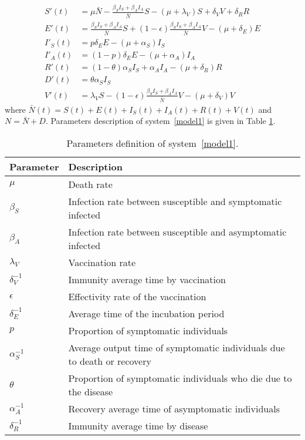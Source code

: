 \begin{equation}\label{model1}
  \begin{aligned}
	S'(t)&=\mu \bar{N}-\frac{\beta_S I_S+\beta_AI_A}{\bar{N}}S-(\mu+\lambda_V)S +\delta_V V+ \delta_R R\\
	E'(t)&= \frac{\beta_S I_S+\beta_AI_A}{\bar{N}}S+(1-\epsilon) \frac{\beta_S I_S+\beta_AI_A}{\bar{N}}V-(\mu+\delta_E) E \\
	I'_S(t)&= p \delta_E E-(\mu+\alpha_S) I_S\\
	I'_A(t)&= (1-p) \delta_E E-(\mu+\alpha_A) I_A \\
	R'(t)&= (1-\theta) \alpha_S I_S+\alpha_A I_A-(\mu+\delta_R) R \\
	D'(t)&= \theta \alpha_S I_S \\
	V'(t)&= \lambda_V S-(1-\epsilon)  \frac{\beta_S I_S+\beta_AI_A}{\bar{N}}V-(\mu+\delta_V) V
      \end{aligned}
\end{equation}
where $\bar{N}(t)=S(t)+E(t)+I_S(t)+I_A(t)+R(t)+V(t)$ and $N=\bar{N}+D$. Parameters description of system~\ref{model1} is given in Table \ref{table1}.
\begin{table}[h!]
    \begin{tabular}{>{\centering}p{}p{}}
			\toprule
			Parameter & Description
      \\
      \midrule
			$\mu$ &  Death rate
			\\
            $\beta_S$ & Infection rate between susceptible and symptomatic infected
			\\
            $\beta_A$ & Infection rate between susceptible and asymptomatic infected
			\\
            $\lambda_V$ & Vaccination rate
			\\
            $\delta_{V}^{-1}$ & Immunity average time by vaccination
			\\
            $\epsilon$ &  Effectivity rate of the vaccination
			\\
            $\delta_{E}^{-1}$ & Average time of the incubation period \\
			$p$ & Proportion of symptomatic individuals  \\			
            $\alpha_{S}^{-1}$ &  Average output time of symptomatic individuals due to death or recovery  \\
            $\theta$ & Proportion of symptomatic individuals who die due to the disease \\ 
			$\alpha_{A}^{-1}$ & Recovery average time of asymptomatic individuals  \\ 					 
            $\delta_{R}^{-1}$ &  Immunity average time by disease \\
      \bottomrule
		\end{tabular}
  \caption{Parameters definition of system~\ref{model1}.}\label{table1}
\end{table}
